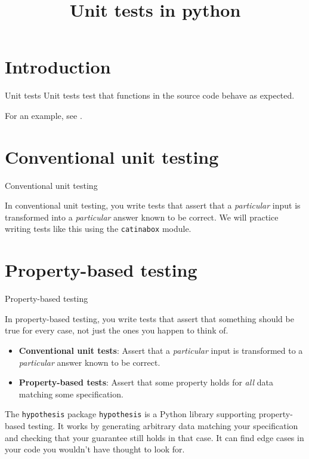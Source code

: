 \documentclass[10pt]{beamer}
\title{Unit tests in python}
\begin{document}
\maketitle

\section{Introduction}

\begin{frame}{Unit tests}
\alert{Unit tests} test that functions in the source code behave as expected. 

 For an example, see \href{https://github.com/mikewojnowicz/acc/blob/master/tests/unit/test_arithmetic.py}{}.
\end{frame}


\section{Conventional unit testing}
\begin{frame}{Conventional unit testing}

In \alert{conventional unit testing}, you write tests that assert that a \textit{particular} input is transformed into a \textit{particular} answer known to be correct.
\vfill 
We will practice writing tests like this using the \texttt{catinabox} module.
\end{frame}


\section{Property-based testing}


\begin{frame}{Property-based testing}

In \alert{property-based testing}, you write tests that assert that something should be true for every case, not just the ones you happen to think of.
\vfill 
\begin{itemize}
\item \textbf{Conventional unit tests}: Assert that a \textit{particular} input is transformed to a \textit{particular} answer known to be correct.
\item \textbf{Property-based tests}: Assert that some property holds for \textit{all} data matching some specification.
\end{itemize}
\vfill 
\pause 
{}
\begin{block}{The \texttt{hypothesis} package}
\texttt{hypothesis} is a Python library supporting property-based testing.
\vfill
It works by generating arbitrary data matching your specification and checking that your guarantee still holds in that case.
\vfill
It can find edge cases in your code you wouldn’t have thought to look for.
\end{block}
\end{frame}
\end{document}

